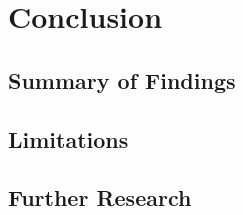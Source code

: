 \chapter{Conclusion}

\section{Summary of Findings}

\section{Limitations}

\section{Further Research}
